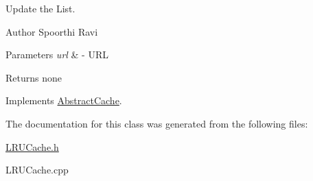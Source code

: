 \-Update the \-List. 

\begin{DoxyAuthor}{\-Author}
\-Spoorthi \-Ravi 
\end{DoxyAuthor}

\begin{DoxyParams}{\-Parameters}
{\em url} & -\/ \-U\-R\-L \\
\hline
\end{DoxyParams}
\begin{DoxyReturn}{\-Returns}
none 
\end{DoxyReturn}


\-Implements \hyperlink{classAbstractCache}{\-Abstract\-Cache}.



\-The documentation for this class was generated from the following files\-:\begin{DoxyCompactItemize}
\item 
\hyperlink{LRUCache_8h}{\-L\-R\-U\-Cache.\-h}\item 
\-L\-R\-U\-Cache.\-cpp\end{DoxyCompactItemize}
